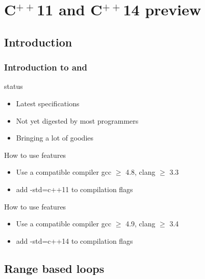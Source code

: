 \section[C$^{++}$11]{C$^{++}$11 and C$^{++}$14 preview}

\iffalse
\subsection[Intro]{Introduction}

\begin{frame}
  \frametitle{Introduction to  and }
  \begin{block}{status}
    \begin{itemize}
    \item Latest \cpp specifications
    \item Not yet digested by most programmers
    \item Bringing a lot of goodies
    \end{itemize}
  \end{block}
  \pause
  \begin{block}{How to use  features}
    \begin{itemize}
    \item Use a compatible compiler gcc $\geq$ 4.8, clang $\geq$ 3.3
    \item add -std=c++11 to compilation flags
    \end{itemize}    
  \end{block}
  \begin{block}{How to use  features}
    \begin{itemize}
    \item Use a compatible compiler gcc $\geq$ 4.9, clang $\geq$ 3.4
    \item add -std=c++14 to compilation flags
    \end{itemize}    
  \end{block}
\end{frame}

\subsection[loop]{Range based loops}

